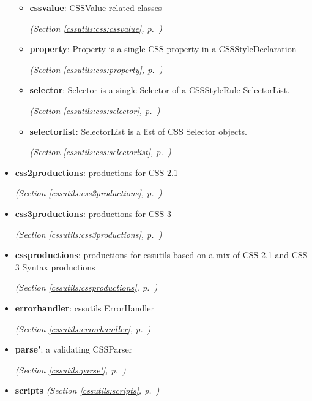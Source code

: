 \begin{itemize}
\begin{itemize}
    \item \textbf{cssvalue}: 
CSSValue related classes


  \textit{(Section \ref{cssutils:css:cssvalue}, p.~\pageref{cssutils:css:cssvalue})}

    \item \textbf{property}: 
Property is a single CSS property in a CSSStyleDeclaration


  \textit{(Section \ref{cssutils:css:property}, p.~\pageref{cssutils:css:property})}

    \item \textbf{selector}: 
Selector is a single Selector of a CSSStyleRule SelectorList.


  \textit{(Section \ref{cssutils:css:selector}, p.~\pageref{cssutils:css:selector})}

    \item \textbf{selectorlist}: 
SelectorList is a list of CSS Selector objects.


  \textit{(Section \ref{cssutils:css:selectorlist}, p.~\pageref{cssutils:css:selectorlist})}

  \end{itemize}
\item \textbf{css2productions}: 
productions for CSS 2.1


  \textit{(Section \ref{cssutils:css2productions}, p.~\pageref{cssutils:css2productions})}

\item \textbf{css3productions}: 
productions for CSS 3


  \textit{(Section \ref{cssutils:css3productions}, p.~\pageref{cssutils:css3productions})}

\item \textbf{cssproductions}: 
productions for cssutils based on a mix of CSS 2.1 and CSS 3 Syntax
productions


  \textit{(Section \ref{cssutils:cssproductions}, p.~\pageref{cssutils:cssproductions})}

\item \textbf{errorhandler}: 
cssutils ErrorHandler


  \textit{(Section \ref{cssutils:errorhandler}, p.~\pageref{cssutils:errorhandler})}

\item \textbf{parse'}: 
a validating CSSParser


  \textit{(Section \ref{cssutils:parse'}, p.~\pageref{cssutils:parse'})}

\item \textbf{scripts}
  \textit{(Section \ref{cssutils:scripts}, p.~\pageref{cssutils:scripts})}


\end{itemize}
